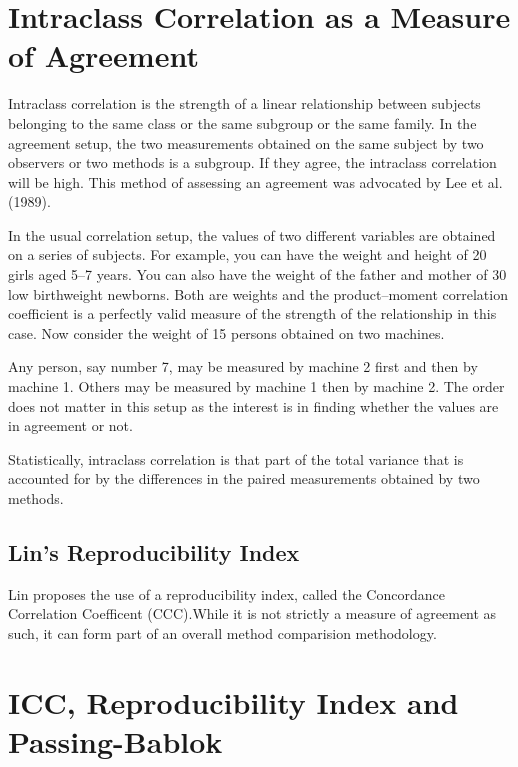 \documentclass[MAIN.tex]{subfiles}
\begin{document}
\section*{Intraclass Correlation as a Measure of Agreement}


Intraclass correlation is the strength of a linear relationship between subjects belonging to the same class or the same subgroup or the same family. In the agreement setup,
the two measurements obtained on the same subject by two observers or two methods is a subgroup. If they agree, the intraclass correlation will be high. This method of
assessing an agreement was advocated by Lee et al. (1989).

In the usual correlation setup, the values of two different variables are obtained on a series of subjects. For example, you can have the weight and height of 20 girls aged 5–7 years. You can also have the weight of the father and mother of 30 low
birthweight newborns. Both are weights and the product–moment correlation coefficient is a perfectly valid measure of the strength of the relationship in this case.
Now consider the weight of 15 persons obtained on two machines. 

Any person, say number 7, may be measured by machine 2 first and then by machine 1. Others may be measured by machine 1 then by machine 2. The order does not matter in this setup as
the interest is in finding whether the values are in agreement or not.

Statistically, intraclass correlation is that part of the total variance that is accounted for by the differences in the paired measurements obtained by two
methods.

	\subsection{Lin's Reproducibility Index} Lin proposes the use of a
	reproducibility index, called the Concordance Correlation
	Coefficent (CCC).While it is not strictly a measure of agreement
	as such, it can form part of an overall method comparision
	methodology.

	\section{ICC, Reproducibility Index and Passing-Bablok }
	
\end{document}
